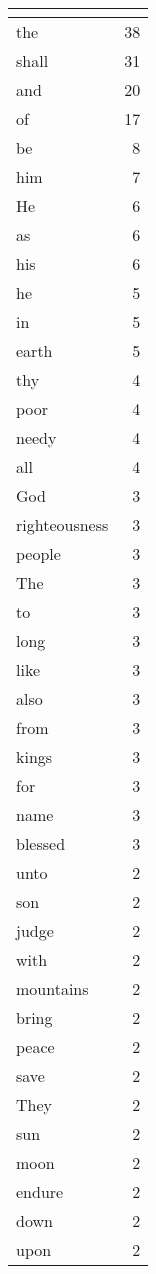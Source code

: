 \begin{center}
\begin{longtable}{l|r}
\hline \multicolumn{2}{c}{{ }} \\ \hline
\endfoot 
the & 38\\ \hline 
shall & 31\\ \hline 
and & 20\\ \hline 
of & 17\\ \hline 
be & 8\\ \hline 
him & 7\\ \hline 
He & 6\\ \hline 
as & 6\\ \hline 
his & 6\\ \hline 
he & 5\\ \hline 
in & 5\\ \hline 
earth & 5\\ \hline 
thy & 4\\ \hline 
poor & 4\\ \hline 
needy & 4\\ \hline 
all & 4\\ \hline 
God & 3\\ \hline 
righteousness & 3\\ \hline 
people & 3\\ \hline 
The & 3\\ \hline 
to & 3\\ \hline 
long & 3\\ \hline 
like & 3\\ \hline 
also & 3\\ \hline 
from & 3\\ \hline 
kings & 3\\ \hline 
for & 3\\ \hline 
name & 3\\ \hline 
blessed & 3\\ \hline 
unto & 2\\ \hline 
son & 2\\ \hline 
judge & 2\\ \hline 
with & 2\\ \hline 
mountains & 2\\ \hline 
bring & 2\\ \hline 
peace & 2\\ \hline 
save & 2\\ \hline 
They & 2\\ \hline 
sun & 2\\ \hline 
moon & 2\\ \hline 
endure & 2\\ \hline 
down & 2\\ \hline 
upon & 2\\ \hline 

\end{longtable}
\end{center}
